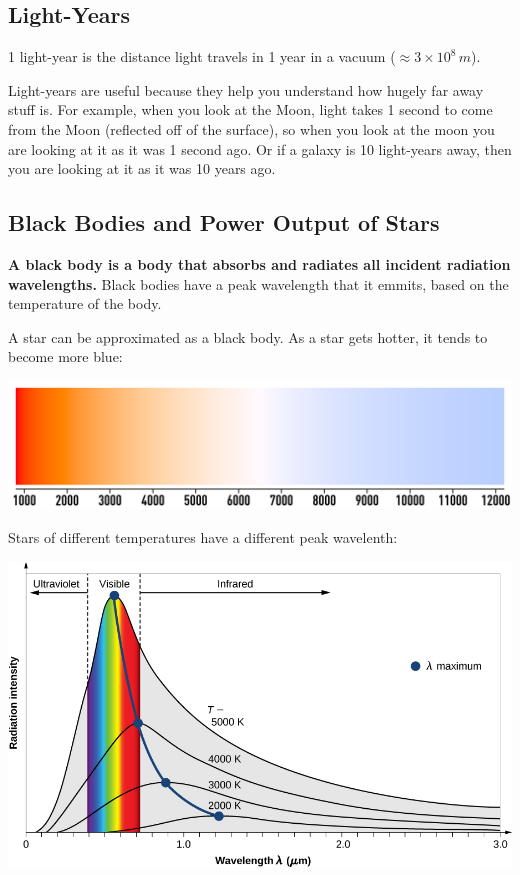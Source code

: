 \documentclass[a4paper, 12pt]{article}
\begin{document}
\subsection{Light-Years}

1 light-year is the distance light travels in 1 year in a vacuum ($\approx 3 \times 10^8 \, m$).

Light-years are useful because they help you understand how hugely far away stuff is. For example, when you look at the Moon, light takes 1 second to come from the Moon (reflected off of the surface), so when you look at the moon you are looking at it as it was 1 second ago. Or if a galaxy is 10 light-years away, then you are looking at it as it was 10 years ago.

\subsection{Black Bodies and Power Output of Stars}

\textbf{A black body is a body that absorbs and radiates all incident radiation wavelengths.} Black bodies have a peak wavelength that it emmits, based on the temperature of the body.

A star can be approximated as a black body. As a star gets hotter, it tends to become more blue:

\begin{center}
\includegraphics[width=\textwidth]{images/blackBodyColour.png}
\end{center}

Stars of different temperatures have a different peak wavelenth:

\begin{center}
\includegraphics[width=\textwidth]{images/blackBodyPeakWav.jpg}
\end{center}
\end{document}
